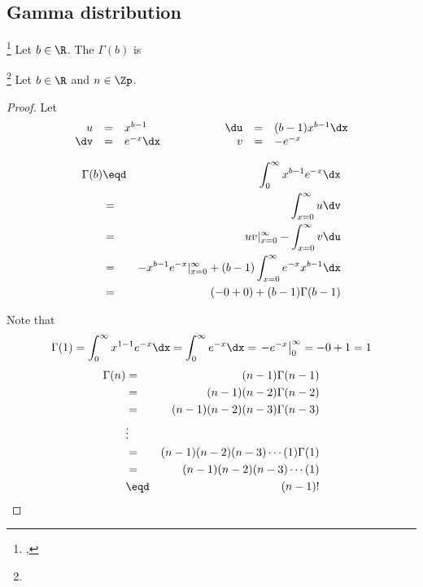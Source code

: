 \subsection{Gamma distribution}
\begin{definition}
\label{def:Gamma(b)}
\footnote{
  ,
  }
Let $b\in\R$. The  $\Gamma(b)$ is
\end{definition}

\begin{proposition}
\footnote{
  }
Let $b\in\R$ and $n\in\Zp$.
\end{proposition}
\begin{proof}
Let
\[\begin{array}{rcl@{\hspace{2cm}}rcl}
  u   &=& x^{b-1}   & \du &=& (b-1)x^{b-1} \dx \\
  \dv &=& e^{-x}\dx & v   &=& -e^{-x}
\end{array}\]

\begin{eqnarray*}
  \Gamma(b)
    &\eqd& \int_0^\infty x^{b-1} e^{-x} \dx
  \\&=&    \int_{x=0}^\infty u \dv
  \\&=&    uv|_{x=0}^\infty - \int_{x=0}^\infty v \du
  \\&=&    -x^{b-1} e^{-x}|_{x=0}^\infty + (b-1)\int_{x=0}^\infty e^{-x} x^{b-1}\dx
  \\&=&    (-0+0) + (b-1)\Gamma(b-1)
\end{eqnarray*}

Note that
  \[ \Gamma(1)
       = \int_0^\infty x^{1-1} e^{-x} \dx
       = \int_0^\infty e^{-x} \dx
       = \left. -e^{-x} \right|_0^\infty
       = -0 + 1
       = 1
  \]
\begin{eqnarray*}
  \Gamma(n)
    &=& (n-1)\Gamma(n-1)
  \\&=& (n-1)(n-2)\Gamma(n-2)
  \\&=& (n-1)(n-2)(n-3)\Gamma(n-3)
  \\&\vdots&
  \\&=& (n-1)(n-2)(n-3)\cdots(1)\Gamma(1)
  \\&=& (n-1)(n-2)(n-3)\cdots(1)
  \\&\eqd& (n-1)!
\end{eqnarray*}
\end{proof}

